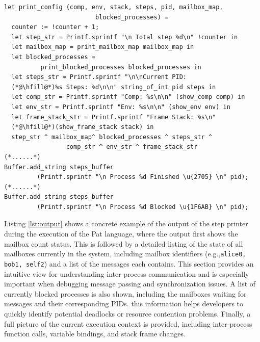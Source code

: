 \documentclass{l4proj}
\begin{document}
\noindent\begin{minipage}{\linewidth}
\lstset{style=Ocamlstyle,}
\begin{lstlisting}[caption={Evaluation step printer}, label={lst:Printer}]
let print_config (comp, env, stack, steps, pid, mailbox_map, 
                         blocked_processes) =
  counter := !counter + 1;
  let step_str = Printf.sprintf "\n Total step %d\n" !counter in
  let mailbox_map = print_mailbox_map mailbox_map in
  let blocked_processes = 
          print_blocked_processes blocked_processes in
  let steps_str = Printf.sprintf "\n\nCurrent PID: 
  (*@\hfill@*)%s Steps: %d\n\n" string_of_int pid steps in
  let comp_str = Printf.sprintf "Comp: %s\n\n" (show_comp comp) in
  let env_str = Printf.sprintf "Env: %s\n\n" (show_env env) in
  let frame_stack_str = Printf.sprintf "Frame Stack: %s\n"
  (*@\hfill@*)(show_frame_stack stack) in
  step_str ^ mailbox_map^ blocked_processes ^ steps_str ^
                 comp_str ^ env_str ^ frame_stack_str
(*......*)
Buffer.add_string steps_buffer
         (Printf.sprintf "\n Process %d Finished \u{2705} \n" pid);
(*......*)
Buffer.add_string steps_buffer 
         (Printf.sprintf "\n Process %d Blocked \u{1F6AB} \n" pid);

\end{lstlisting}
\end{minipage}
Listing \ref{lst:output} shows a concrete example of the output of the step printer during the execution of the Pat language, where the output first shows the mailbox count status. This is followed by a detailed listing of the state of all mailboxes currently in the system, including mailbox identifiers (e.g.,\texttt{alice0, bob1, self2}) and a list of the messages each contains. This section provides an intuitive view for understanding inter-process communication and is especially important when debugging message passing and synchronization issues. A list of currently blocked processes is also shown, including the mailboxes waiting for messages and their corresponding PIDs. this information helps developers to quickly identify potential deadlocks or resource contention problems. Finally, a full picture of the current execution context is provided, including inter-process function calls, variable bindings, and stack frame changes.
\end{document}
